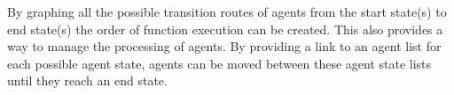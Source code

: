 \documentclass[a4paper,12pt]{article}
\begin{document}
By graphing all the possible transition routes of agents from the start state(s) to end state(s) the order of function execution can be created. This also provides a way to manage the processing of agents. By providing a link to an agent list for each possible agent state, agents can be moved between these agent state lists until they reach an end state.

%
%
\end{document}
